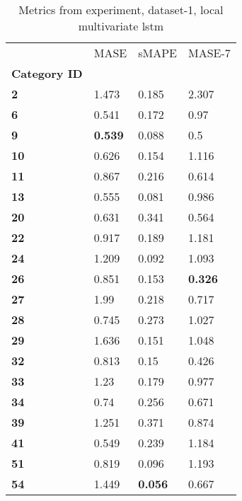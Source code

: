 \begin{table}[H]
\centering
\caption{Metrics from experiment, dataset-1, local multivariate lstm}
\label{table:local-multivariate-lstm-dataset-1}
\begin{tabular}{llll}
\toprule
{} &            MASE &           sMAPE &          MASE-7 \\
\textbf{Category ID} &                 &                 &                 \\
\midrule
\textbf{2          } &           1.473 &           0.185 &           2.307 \\
\textbf{6          } &           0.541 &           0.172 &            0.97 \\
\textbf{9          } &  \textbf{0.539} &           0.088 &             0.5 \\
\textbf{10         } &           0.626 &           0.154 &           1.116 \\
\textbf{11         } &           0.867 &           0.216 &           0.614 \\
\textbf{13         } &           0.555 &           0.081 &           0.986 \\
\textbf{20         } &           0.631 &           0.341 &           0.564 \\
\textbf{22         } &           0.917 &           0.189 &           1.181 \\
\textbf{24         } &           1.209 &           0.092 &           1.093 \\
\textbf{26         } &           0.851 &           0.153 &  \textbf{0.326} \\
\textbf{27         } &            1.99 &           0.218 &           0.717 \\
\textbf{28         } &           0.745 &           0.273 &           1.027 \\
\textbf{29         } &           1.636 &           0.151 &           1.048 \\
\textbf{32         } &           0.813 &            0.15 &           0.426 \\
\textbf{33         } &            1.23 &           0.179 &           0.977 \\
\textbf{34         } &            0.74 &           0.256 &           0.671 \\
\textbf{39         } &           1.251 &           0.371 &           0.874 \\
\textbf{41         } &           0.549 &           0.239 &           1.184 \\
\textbf{51         } &           0.819 &           0.096 &           1.193 \\
\textbf{54         } &           1.449 &  \textbf{0.056} &           0.667 \\
\bottomrule
\end{tabular}
\end{table}
